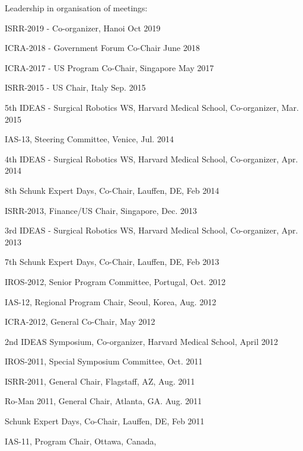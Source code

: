 \documentclass{article}
\begin{document}
\begin{cv}
\begin{cvlist}{Leadership in organisation of meetings:}
\item ISRR-2019 - Co-organizer, Hanoi \cftdotfill{\cftdotsep}
  Oct 2019
\item ICRA-2018 - Government Forum Co-Chair \cftdotfill{\cftdotsep}
  June 2018
\item ICRA-2017 - US Program Co-Chair, Singapore
  \cftdotfill{\cftdotsep} May 2017
\item ISRR-2015 - US Chair, Italy \cftdotfill{\cftdotsep} Sep. 2015
\item 5th IDEAS - Surgical Robotics WS, Harvard Medical School,
  Co-organizer, \cftdotfill{\cftdotsep} Mar. 2015
\item IAS-13, Steering Committee, Venice, \cftdotfill{\cftdotsep}
  Jul. 2014
\item 4th IDEAS - Surgical Robotics WS, Harvard Medical School,
  Co-organizer, \cftdotfill{\cftdotsep} Apr. 2014
\item 8th Schunk Expert Days, Co-Chair, Lauffen, DE,
  \cftdotfill{\cftdotsep} Feb 2014
\item ISRR-2013, Finance/US Chair, Singapore, \cftdotfill{\cftdotsep}
  Dec. 2013
\item 3rd IDEAS - Surgical Robotics WS, Harvard Medical School,
  Co-organizer, \cftdotfill{\cftdotsep} Apr. 2013
\item 7th Schunk Expert Days, Co-Chair, Lauffen, DE,
  \cftdotfill{\cftdotsep} Feb 2013
\item IROS-2012, Senior Program Committee,
  Portugal,\cftdotfill{\cftdotsep} Oct. 2012
\item IAS-12, Regional Program Chair, Seoul, Korea,
  \cftdotfill{\cftdotsep} Aug. 2012
\item ICRA-2012, General Co-Chair, \cftdotfill{\cftdotsep} May 2012
\item 2nd IDEAS Symposium, Co-organizer, Harvard Medical School,
  \cftdotfill{\cftdotsep} April 2012
\item IROS-2011, Special Symposium Committee, \cftdotfill{\cftdotsep}
  Oct. 2011
\item ISRR-2011, General Chair, Flagstaff, AZ, \cftdotfill{\cftdotsep}
  Aug. 2011
\item Ro-Man 2011, General Chair, Atlanta, GA.
  \cftdotfill{\cftdotsep} Aug. 2011
\item Schunk Expert Days, Co-Chair, Lauffen, DE,
  \cftdotfill{\cftdotsep} Feb 2011
\item IAS-11, Program Chair, Ottawa, Canada, \cftdotfill{\cftdotsep}

\end{cvlist}
\end{cv}
\end{document}
